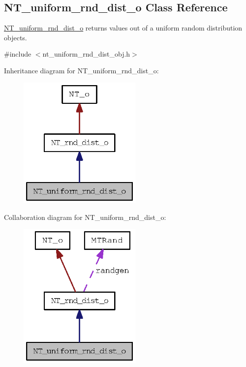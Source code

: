 \subsection{NT\_\-uniform\_\-rnd\_\-dist\_\-o Class Reference}
\label{class_n_t__uniform__rnd__dist__o}


\hyperlink{class_n_t__uniform__rnd__dist__o}{NT\_\-uniform\_\-rnd\_\-dist\_\-o} returns values out of a uniform random distribution objects.  




{\ttfamily \#include $<$nt\_\-uniform\_\-rnd\_\-dist\_\-obj.h$>$}



Inheritance diagram for NT\_\-uniform\_\-rnd\_\-dist\_\-o:
\nopagebreak
\begin{figure}[H]
\begin{center}
\leavevmode
\includegraphics[width=170pt]{class_n_t__uniform__rnd__dist__o__inherit__graph}
\end{center}
\end{figure}


Collaboration diagram for NT\_\-uniform\_\-rnd\_\-dist\_\-o:
\nopagebreak
\begin{figure}[H]
\begin{center}
\leavevmode
\includegraphics[width=170pt]{class_n_t__uniform__rnd__dist__o__coll__graph}
\end{center}
\end{figure}
